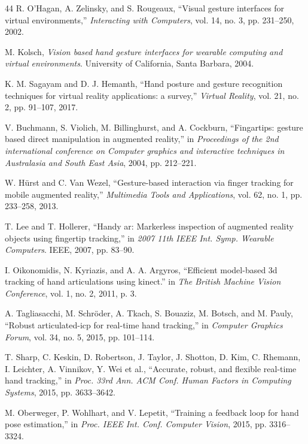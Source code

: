 \documentclass[11pt]{article}
\begin{document}
\begin{thebibliography}{44}
R. O'Hagan, A. Zelinsky, and S. Rougeaux, ``Visual gesture interfaces for virtual environments,'' \emph{Interacting with Computers}, vol. 14, no. 3, pp. 231--250, 2002.

M. Kolsch, \emph{Vision based hand gesture interfaces for wearable computing and virtual environments}. University of California, Santa Barbara, 2004.

K. M. Sagayam and D. J. Hemanth, ``Hand posture and gesture recognition techniques for virtual reality applications: a survey,'' \emph{Virtual Reality}, vol. 21, no. 2, pp. 91--107, 2017.

V. Buchmann, S. Violich, M. Billinghurst, and A. Cockburn, ``Fingartips: gesture based direct manipulation in augmented reality,'' in \emph{Proceedings of the 2nd international conference on Computer graphics and interactive techniques in Australasia and South East Asia}, 2004, pp. 212--221.

W. H{\"u}rst and C. Van Wezel, ``Gesture-based interaction via finger tracking for mobile augmented reality,'' \emph{Multimedia Tools and Applications}, vol. 62, no. 1, pp. 233--258, 2013.

T. Lee and T. Hollerer, ``Handy ar: Markerless inspection of augmented reality objects using fingertip tracking,'' in \emph{2007 11th IEEE Int. Symp. Wearable Computers}. IEEE, 2007, pp. 83--90.

I. Oikonomidis, N. Kyriazis, and A. A. Argyros, ``Efficient model-based 3d tracking of hand articulations using kinect.'' in \emph{The British Machine Vision Conference}, vol. 1, no. 2, 2011, p. 3.

A. Tagliasacchi, M. Schr{\"o}der, A. Tkach, S. Bouaziz, M. Botsch, and M. Pauly, ``Robust articulated-icp for real-time hand tracking,'' in \emph{Computer Graphics Forum}, vol. 34, no. 5, 2015, pp. 101--114.

T. Sharp, C. Keskin, D. Robertson, J. Taylor, J. Shotton, D. Kim, C. Rhemann, I. Leichter, A. Vinnikov, Y. Wei et al., ``Accurate, robust, and flexible real-time hand tracking,'' in \emph{Proc. 33rd Ann. ACM Conf. Human Factors in Computing Systems}, 2015, pp. 3633--3642.

M. Oberweger, P. Wohlhart, and V. Lepetit, ``Training a feedback loop for hand pose estimation,'' in \emph{Proc. IEEE Int. Conf. Computer Vision}, 2015, pp. 3316--3324.


\end{thebibliography}
\end{document}
